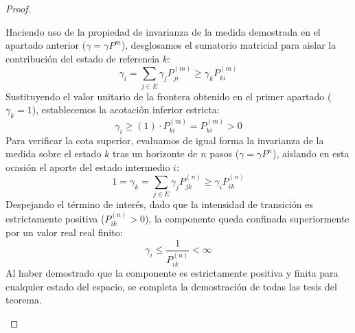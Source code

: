 \begin{teo}
\begin{proof}
\begin{description}
            Haciendo uso de la propiedad de invarianza de la medida demostrada en el apartado anterior ($\gamma = \gamma P^m$), desglosamos el sumatorio matricial para aislar la contribución del estado de referencia $k$:
            \[ 
            \gamma_i = \sum_{j \in E} \gamma_j P_{ji}^{(m)} \geq \gamma_k P_{ki}^{(m)} 
            \]
            Sustituyendo el valor unitario de la frontera obtenido en el primer apartado ($\gamma_k = 1$), establecemos la acotación inferior estricta:
            \[
            \gamma_i \geq (1) \cdot P_{ki}^{(m)} = P_{ki}^{(m)} > 0
            \]
            Para verificar la cota superior, evaluamos de igual forma la invarianza de la medida sobre el estado $k$ tras un horizonte de $n$ pasos ($\gamma = \gamma P^n$), aislando en esta ocasión el aporte del estado intermedio $i$:
            \[ 
            1 = \gamma_k = \sum_{j \in E} \gamma_j P_{jk}^{(n)} \geq \gamma_i P_{ik}^{(n)} 
            \]
            Despejando el término de interés, dado que la intensidad de transición es estrictamente positiva ($P_{ik}^{(n)} > 0$), la componente queda confinada superiormente por un valor real real finito:
            \[ 
            \gamma_i \leq \frac{1}{P_{ik}^{(n)}} < \infty 
            \]
            Al haber demostrado que la componente es estrictamente positiva y finita para cualquier estado del espacio, se completa la demostración de todas las tesis del teorema.
    \end{description} 
\end{proof}
\end{teo}

